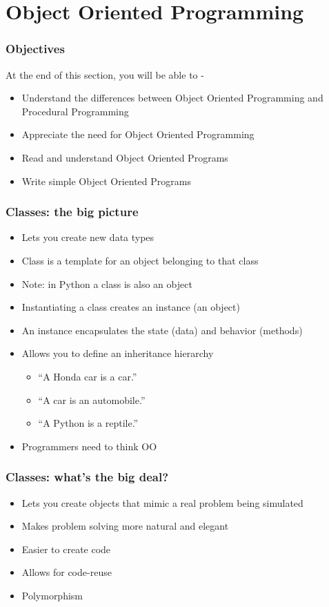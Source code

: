 \section{Object Oriented Programming}

\begin{frame}[fragile]
  \frametitle{Objectives}
  At the end of this section, you will be able to -
  \begin{itemize}
  \item Understand the differences between Object Oriented Programming
    and Procedural Programming
  \item Appreciate the need for Object Oriented Programming
  \item Read and understand Object Oriented Programs
  \item Write simple Object Oriented Programs
  \end{itemize}
\end{frame}

\begin{frame}[fragile]
  \frametitle{Classes: the big picture}
  \begin{itemize}
  \item Lets you create new data types
  \item Class is a template for an object belonging to that class
  \item Note: in Python a class is also an object
  \item Instantiating a class creates an instance (an object)
  \item An instance encapsulates the state (data) and behavior
    (methods)
  \item Allows you to define an inheritance hierarchy
    \begin{itemize}
    \item ``A Honda car \alert{is a} car.''
    \item ``A car \alert{is an} automobile.''
    \item ``A Python \alert{is a} reptile.''
    \end{itemize}
  \item Programmers need to think OO
  \end{itemize}
\end{frame}

\begin{frame}[fragile]
  \frametitle{Classes: what's the big deal?}
  \begin{itemize}
  \item Lets you create objects that mimic a real problem being
    simulated
  \item Makes problem solving more natural and elegant
  \item Easier to create code
  \item Allows for code-reuse
  \item Polymorphism
  \end{itemize}
\end{frame}

